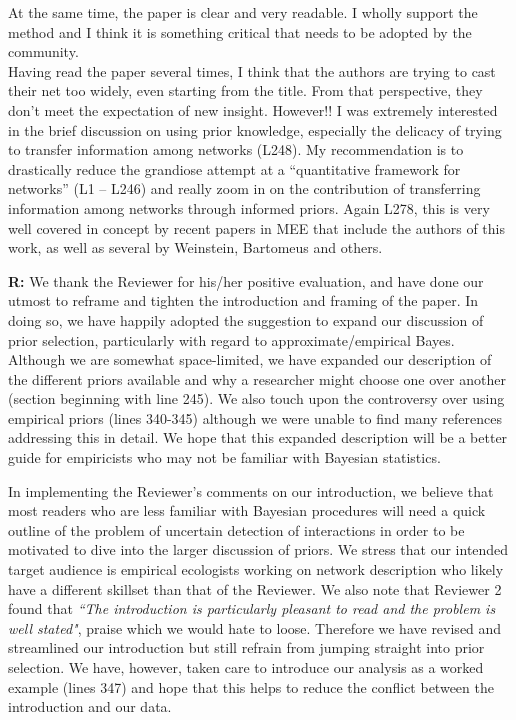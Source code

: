 \documentclass[12pt]{letter}
\newenvironment{refquote}{\bigskip \begin{it}}{\end{it}\smallskip}
\begin{document}
\begin{refquote}
			At the same time, the paper is clear and very readable. I wholly support the method and I think it is something critical that needs to be adopted by the community. \\
			Having read the paper several times, I think that the authors are trying to cast their net too widely, even starting from the title. From that perspective, they don’t meet the expectation of new insight. However!! I was extremely interested in the brief discussion on using prior knowledge, especially the delicacy of trying to transfer information among networks (L248). My recommendation is to drastically reduce the grandiose attempt at a “quantitative framework for networks” (L1 – L246) and really zoom in on the contribution of transferring information among networks through informed priors.	Again L278, this is very well covered in concept by recent papers in MEE that include the authors of this work, as well as several by Weinstein, Bartomeus and others.
			\end{refquote}


		\textbf{R:} We thank the Reviewer for his/her positive evaluation, and have done our utmost to reframe and tighten the introduction and framing of the paper. In doing so, we have happily adopted the suggestion to expand our discussion of prior selection, particularly with regard to approximate/empirical Bayes. Although we are somewhat space-limited, we have expanded our description of the different priors available and why a researcher might choose one over another (section beginning with line 245). We also touch upon the controversy over using empirical priors (lines 340-345) although we were unable to find many references addressing this in detail. We hope that this expanded description will be a better guide for empiricists who may not be familiar with Bayesian statistics.


		In implementing the Reviewer's comments on our introduction, we believe that most readers who are less familiar with Bayesian procedures will need a quick outline of the problem of uncertain detection of interactions in order to be motivated to dive into the larger discussion of priors. We stress that our intended target audience is empirical ecologists working on network description who likely have a different skillset than that of the Reviewer. We also note that Reviewer 2 found that \emph{``The introduction is particularly pleasant to read and the problem is well stated"}, praise which we would hate to loose. Therefore we have revised and streamlined our introduction but still refrain from jumping straight into prior selection. We have, however, taken care to introduce our analysis as a worked example (lines 347) and hope that this helps to reduce the conflict between the introduction and our data. 
\end{document}
